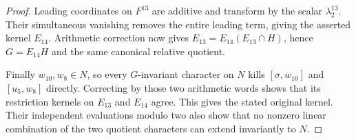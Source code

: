 \begin{proof}
Leading coordinates on $F^{13}$ are additive and transform
by the scalar $\lambda_2^{13}$. Their simultaneous vanishing
removes the entire leading term, giving the asserted kernel
$E_{14}$. Arithmetic correction now gives
$E_{13}=E_{14}(E_{13}\cap H)$, hence $G=E_{14}H$ and the same
canonical relative quotient.

Finally $w_{10},w_8\in N$, so every $G$-invariant character
on $N$ kills $[\sigma,w_{10}]$ and $[u_5,w_8]$ directly.
Correcting by those two arithmetic words shows that its
restriction kernels on $E_{13}$ and $E_{14}$ agree.
This gives the stated original kernel. Their independent
evaluations modulo two also show that no nonzero linear
combination of the two quotient characters can extend
invariantly to $N$.
\end{proof}
